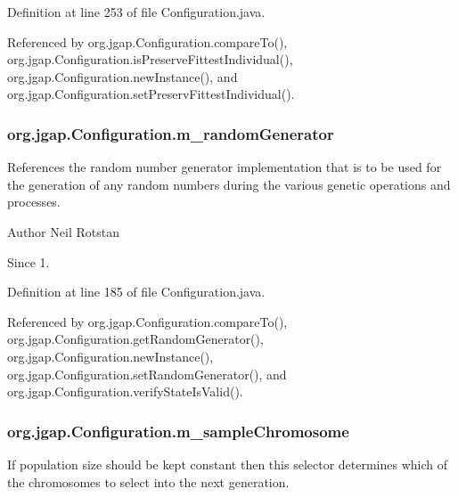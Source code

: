Definition at line 253 of file Configuration.\-java.



Referenced by org.\-jgap.\-Configuration.\-compare\-To(), org.\-jgap.\-Configuration.\-is\-Preserve\-Fittest\-Individual(), org.\-jgap.\-Configuration.\-new\-Instance(), and org.\-jgap.\-Configuration.\-set\-Preserv\-Fittest\-Individual().

\hypertarget{classorg_1_1jgap_1_1_configuration_a2fefa16eac7e1026d6157a3cddd1d815}{
\subsubsection[{m\-\_\-random\-Generator}]{ org.\-jgap.\-Configuration.\-m\-\_\-random\-Generator\hspace{0.3cm}{\ttfamily [private]}}}\label{classorg_1_1jgap_1_1_configuration_a2fefa16eac7e1026d6157a3cddd1d815}
References the random number generator implementation that is to be used for the generation of any random numbers during the various genetic operations and processes.

\begin{DoxyAuthor}{Author}
Neil Rotstan 
\end{DoxyAuthor}
\begin{DoxySince}{Since}
1. 
\end{DoxySince}


Definition at line 185 of file Configuration.\-java.



Referenced by org.\-jgap.\-Configuration.\-compare\-To(), org.\-jgap.\-Configuration.\-get\-Random\-Generator(), org.\-jgap.\-Configuration.\-new\-Instance(), org.\-jgap.\-Configuration.\-set\-Random\-Generator(), and org.\-jgap.\-Configuration.\-verify\-State\-Is\-Valid().

\hypertarget{classorg_1_1jgap_1_1_configuration_a47498d7f8e430011625b82986f28f33c}{
\subsubsection[{m\-\_\-sample\-Chromosome}]{ org.\-jgap.\-Configuration.\-m\-\_\-sample\-Chromosome\hspace{0.3cm}{\ttfamily [private]}}}\label{classorg_1_1jgap_1_1_configuration_a47498d7f8e430011625b82986f28f33c}
If population size should be kept constant then this selector determines which of the chromosomes to select into the next generation.

